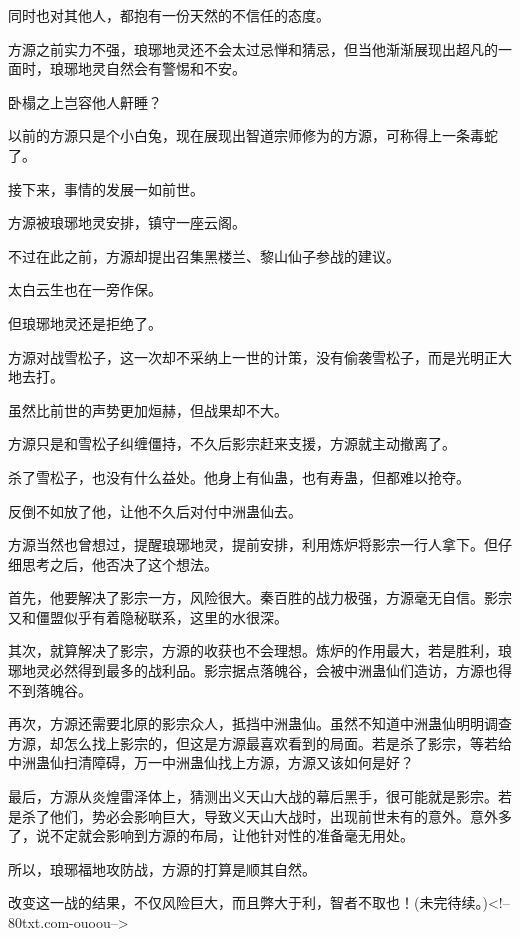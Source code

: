 \begin{this_body}
同时也对其他人，都抱有一份天然的不信任的态度。

方源之前实力不强，琅琊地灵还不会太过忌惮和猜忌，但当他渐渐展现出超凡的一面时，琅琊地灵自然会有警惕和不安。

卧榻之上岂容他人鼾睡？

以前的方源只是个小白兔，现在展现出智道宗师修为的方源，可称得上一条毒蛇了。

接下来，事情的发展一如前世。

方源被琅琊地灵安排，镇守一座云阁。

不过在此之前，方源却提出召集黑楼兰、黎山仙子参战的建议。

太白云生也在一旁作保。

但琅琊地灵还是拒绝了。

方源对战雪松子，这一次却不采纳上一世的计策，没有偷袭雪松子，而是光明正大地去打。

虽然比前世的声势更加烜赫，但战果却不大。

方源只是和雪松子纠缠僵持，不久后影宗赶来支援，方源就主动撤离了。

杀了雪松子，也没有什么益处。他身上有仙蛊，也有寿蛊，但都难以抢夺。

反倒不如放了他，让他不久后对付中洲蛊仙去。

方源当然也曾想过，提醒琅琊地灵，提前安排，利用炼炉将影宗一行人拿下。但仔细思考之后，他否决了这个想法。

首先，他要解决了影宗一方，风险很大。秦百胜的战力极强，方源毫无自信。影宗又和僵盟似乎有着隐秘联系，这里的水很深。

其次，就算解决了影宗，方源的收获也不会理想。炼炉的作用最大，若是胜利，琅琊地灵必然得到最多的战利品。影宗据点落魄谷，会被中洲蛊仙们造访，方源也得不到落魄谷。

再次，方源还需要北原的影宗众人，抵挡中洲蛊仙。虽然不知道中洲蛊仙明明调查方源，却怎么找上影宗的，但这是方源最喜欢看到的局面。若是杀了影宗，等若给中洲蛊仙扫清障碍，万一中洲蛊仙找上方源，方源又该如何是好？

最后，方源从炎煌雷泽体上，猜测出义天山大战的幕后黑手，很可能就是影宗。若是杀了他们，势必会影响巨大，导致义天山大战时，出现前世未有的意外。意外多了，说不定就会影响到方源的布局，让他针对性的准备毫无用处。

所以，琅琊福地攻防战，方源的打算是顺其自然。

改变这一战的结果，不仅风险巨大，而且弊大于利，智者不取也！(未完待续。)<!--80txt.com-ouoou-->

\end{this_body}

